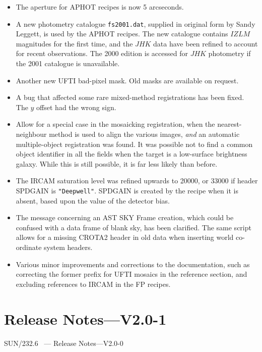 \documentclass[twoside,11pt]{article}
\newcommand{\stardocinitials}  {SUN}
\newcommand{\stardocnumber}    {232.6}
\newcommand{\stardocname}{\stardocinitials /\stardocnumber}
\newcommand{\xlabel}[1]{}
\renewcommand{\_}{\texttt{\symbol{95}}}
\begin{document}
\begin{itemize}
   \item The aperture for \_APHOT recipes is now 5 arcseconds.
   \item A new photometry catalogue {\tt fs2001.dat}, supplied in
      original form by Sandy Leggett, is used by the \_APHOT recipes.
      The new catalogue contains $IZLM$ magnitudes for the first time,
      and the $JHK$ data have been refined to account for recent
      observations.  The 2000 edition is accessed for $JHK$ photometry
      if the 2001 catalogue is unavailable. 
   \item Another new UFTI bad-pixel mask.  Old masks are available on
      request.
   \item A bug that affected some rare mixed-method registrations has
      been fixed.  The $y$ offset had the wrong sign.
   \item Allow for a special case in the mosaicking registration, when
      the nearest-neighbour method is used to align the various images,
      {\em{and}} an automatic multiple-object registration was found.
      It was possible not to find a common object identifier in all
      the fields when the target is a low-surface brightness galaxy.
      While this is still possible, it is far less likely than before.
   \item The IRCAM saturation level was refined upwards to 20000, or
      33000 if header SPD\_GAIN is {\tt{"Deepwell"}}.  SPD\_GAIN
      is created by the recipe when it is absent, based upon the value
      of the detector bias.
   \item The message concerning an AST SKY Frame creation,
      which could be confused with a data frame of blank sky, has been
      clarified.  The same script allows for a missing CROTA2 header
      in old data when inserting world co-ordinate system headers.
   \item Various minor improvements and corrections to the
      documentation, such as correcting the former prefix for UFTI
      mosaics in the reference section, and excluding references to
      IRCAM in the FP recipes.
\end{itemize}


\section{\xlabel{se_changes2p0}Release Notes---V2.0-1\label{se_changes2p0}}
\markboth{{\stardocname}~ --- Release Notes---V2.0-0}
{{\stardocname}~ --- Release Notes---V2.0-0}
\end{document}
